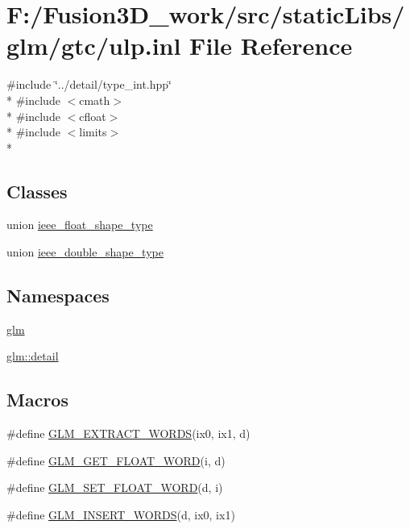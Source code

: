 \hypertarget{ulp_8inl}{}\section{F\+:/\+Fusion3\+D\+\_\+work/src/static\+Libs/glm/gtc/ulp.inl File Reference}
\label{ulp_8inl}
{\ttfamily \#include \char`\"{}../detail/type\+\_\+int.\+hpp\char`\"{}}\\*
{\ttfamily \#include $<$cmath$>$}\\*
{\ttfamily \#include $<$cfloat$>$}\\*
{\ttfamily \#include $<$limits$>$}\\*
\subsection*{Classes}
\begin{DoxyCompactItemize}
\item 
union \hyperlink{unionieee__float__shape__type}{ieee\+\_\+float\+\_\+shape\+\_\+type}
\item 
union \hyperlink{unionieee__double__shape__type}{ieee\+\_\+double\+\_\+shape\+\_\+type}
\end{DoxyCompactItemize}
\subsection*{Namespaces}
\begin{DoxyCompactItemize}
\item 
 \hyperlink{namespaceglm}{glm}
\item 
 \hyperlink{namespaceglm_1_1detail}{glm\+::detail}
\end{DoxyCompactItemize}
\subsection*{Macros}
\begin{DoxyCompactItemize}
\item 
\#define \hyperlink{ulp_8inl_a037d712bb7eec79dcd0073eb07d3f3e8}{G\+L\+M\+\_\+\+E\+X\+T\+R\+A\+C\+T\+\_\+\+W\+O\+R\+D\+S}(ix0,  ix1,  d)
\item 
\#define \hyperlink{ulp_8inl_a28d9056369280955e923f99180ccb23c}{G\+L\+M\+\_\+\+G\+E\+T\+\_\+\+F\+L\+O\+A\+T\+\_\+\+W\+O\+R\+D}(i,  d)
\item 
\#define \hyperlink{ulp_8inl_ab01ab8df0632f4a5f05e00f570e6b873}{G\+L\+M\+\_\+\+S\+E\+T\+\_\+\+F\+L\+O\+A\+T\+\_\+\+W\+O\+R\+D}(d,  i)
\item 
\#define \hyperlink{ulp_8inl_ac4ec14cb5c94f0ca1d594457ee17636f}{G\+L\+M\+\_\+\+I\+N\+S\+E\+R\+T\+\_\+\+W\+O\+R\+D\+S}(d,  ix0,  ix1)
\end{DoxyCompactItemize}
